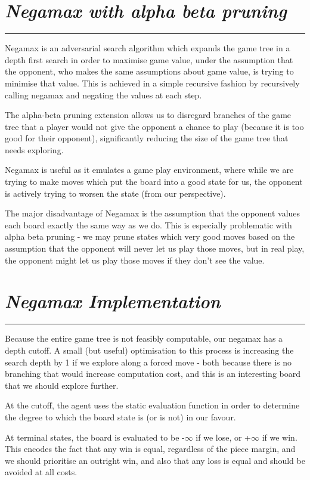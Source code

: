 \documentclass[10pt]{report}
\begin{document}
\begin{multicols}{2}
\section*{\emph{Negamax with alpha beta pruning}}
\hrule

Negamax is an adversarial search algorithm which expands the game tree in a depth first search in order to maximise game value, under the assumption that the opponent, who makes the same assumptions about game value, is trying to minimise that value. This is achieved in a simple recursive fashion by recursively calling negamax and negating the values at each step.

The alpha-beta pruning extension allows us to disregard branches of the game tree that a player would not give the opponent a chance to play (because it is too good for their opponent), significantly reducing the size of the game tree that needs exploring.

Negamax is useful as it emulates a game play environment, where while we are trying to make moves which put the board into a good state for us, the opponent is actively trying to worsen the state (from our perspective).

The major disadvantage of Negamax is the assumption that the opponent values each board exactly the same way as we do. This is especially problematic with alpha beta pruning - we may prune states which very good moves based on the assumption that the opponent will never let us play those moves, but in real play, the opponent might let us play those moves if they don't see the value.
\section*{\emph{\textmd{Negamax Implementation}}}
\hrule

Because the entire game tree is not feasibly computable, our negamax has a depth cutoff. A small (but useful) optimisation to this process is increasing the search depth by 1 if we explore along a forced move - both because there is no branching that would increase computation cost, and this is an interesting board that we should explore further.

At the cutoff, the agent uses the static evaluation function in order to determine the degree to which the board state is (or is not) in our favour.

At terminal states, the board is evaluated to be -$\infty$ if we lose, or +$\infty$ if we win. This encodes the fact that any win is equal, regardless of the piece margin, and we should prioritise an outright win, and also that any loss is equal and should be avoided at all costs.


\end{multicols}
\end{document}
